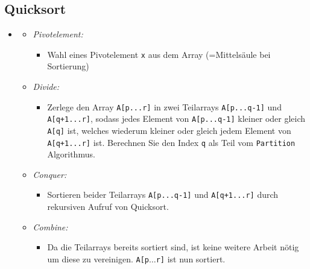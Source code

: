 \documentclass[
    12pt,
    a4paper,
    ngerman,
    color=3b,%
    marginpar=false,
    colorback=false,
    leqno,
]{tudaexercise}
\begin{document}
\subsection{Quicksort}\label{Quicksort}
\begin{itemize}
    \item {}
          \begin{itemize}
              \item \textit{Pivotelement:}
                    \begin{itemize}
                        \item[]
                              Wahl eines Pivotelement \texttt{x} aus dem Array (=Mittelsäule bei Sortierung)
                    \end{itemize}

              \item \textit{Divide:}
                    \begin{itemize}
                        \item[]
                              Zerlege den Array \texttt{A[p...r]} in zwei Teilarrays \texttt{A[p...q-1]} und \texttt{A[q+1...r]},
                              sodass jedes Element von \texttt{A[p...q-1]} kleiner oder gleich \texttt{A[q]} ist, welches
                              wiederum kleiner oder gleich jedem Element von \texttt{A[q+1...r]} ist. Berechnen Sie den Index \texttt{q}
                              als Teil vom \texttt{Partition} Algorithmus.
                    \end{itemize}

              \item \textit{Conquer:}
                    \begin{itemize}
                        \item[]
                              Sortieren beider Teilarrays \texttt{A[p...q-1]} und \texttt{A[q+1...r]} durch rekursiven Aufruf von
                              Quicksort.
                    \end{itemize}

              \item \textit{Combine:}
                    \begin{itemize}
                        \item[]
                              Da die Teilarrays bereits sortiert sind, ist keine weitere Arbeit nötig um diese zu vereinigen.
                              \texttt{A[p$\ldots$r]} ist nun sortiert.
                    \end{itemize}
          \end{itemize}


\end{itemize}
\end{document}
